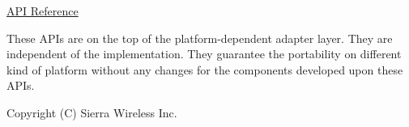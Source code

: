 \hyperlink{pa__mrc_8h}{A\+PI Reference}





These A\+P\+Is are on the top of the platform-\/dependent adapter layer. They are independent of the implementation. They guarantee the portability on different kind of platform without any changes for the components developed upon these A\+P\+Is.





Copyright (C) Sierra Wireless Inc. 